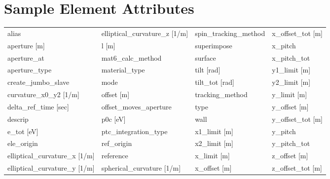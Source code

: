  \section{Sample Element Attributes}
 \label{s:list.sample}
 
 \begin{tabular}{llll} \toprule
alias                          & elliptical_curvature_z [1/m]   & spin_tracking_method           & x_offset_tot [m]               \\
aperture [m]                   & l [m]                          & superimpose                    & x_pitch                        \\
aperture_at                    & mat6_calc_method               & surface                        & x_pitch_tot                    \\
aperture_type                  & material_type                  & tilt [rad]                     & y1_limit [m]                   \\
create_jumbo_slave             & mode                           & tilt_tot [rad]                 & y2_limit [m]                   \\
curvature_x0_y2 [1/m]          & offset [m]                     & tracking_method                & y_limit [m]                    \\
delta_ref_time [sec]           & offset_moves_aperture          & type                           & y_offset [m]                   \\
descrip                        & p0c [eV]                       & wall                           & y_offset_tot [m]               \\
e_tot [eV]                     & ptc_integration_type           & x1_limit [m]                   & y_pitch                        \\
ele_origin                     & ref_origin                     & x2_limit [m]                   & y_pitch_tot                    \\
elliptical_curvature_x [1/m]   & reference                      & x_limit [m]                    & z_offset [m]                   \\
elliptical_curvature_y [1/m]   & spherical_curvature [1/m]      & x_offset [m]                   & z_offset_tot [m]               \\
 \bottomrule
 \end{tabular}
 \vfill
 

